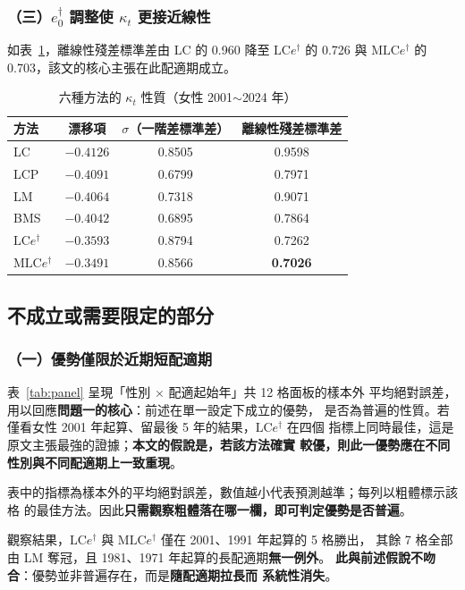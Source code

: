 \documentclass[UTF8, fontset=macnew, a4paper, 12pt]{ctexart}
\newcommand{\edag}{e_0^{\dagger}}
\newcommand{\LCe}{\mathrm{LC}e^{\dagger}}
\begin{document}
\subsubsection{（三）$\edag$ 調整使 $\kappa_t$ 更接近線性}

如表~\ref{tab:kappa}，離線性殘差標準差由 LC 的 0.960 降至 $\LCe$ 的 0.726 與 M$\LCe$ 的
0.703，該文的核心主張在此配適期成立。

\begin{table}[H]
\centering
\caption{六種方法的 $\kappa_t$ 性質（女性 2001$\sim$2024 年）}
\small
\begin{tabular}{lccc}
\toprule
方法 & 漂移項 & $\sigma$（一階差標準差） & 離線性殘差標準差\\
\midrule
LC      & $-0.4126$ & 0.8505 & 0.9598\\
LCP     & $-0.4091$ & 0.6799 & 0.7971\\
LM      & $-0.4064$ & 0.7318 & 0.9071\\
BMS     & $-0.4042$ & 0.6895 & 0.7864\\
$\LCe$  & $-0.3593$ & 0.8794 & 0.7262\\
M$\LCe$ & $-0.3491$ & 0.8566 & \textbf{0.7026}\\
\bottomrule
\end{tabular}
\label{tab:kappa}
\end{table}

\subsection{不成立或需要限定的部分}

\subsubsection{（一）優勢僅限於近期短配適期}\label{sec:window}

表~\ref{tab:panel} 呈現「性別 $\times$ 配適起始年」共 12 格面板的樣本外
平均絕對誤差，用以回應\textbf{問題一的核心}：前述在單一設定下成立的優勢，
是否為普遍的性質。若僅看女性 2001 年起算、留最後 5 年的結果，$\LCe$ 在四個
指標上同時最佳，這是原文主張最強的證據；\textbf{本文的假說是，若該方法確實
較優，則此一優勢應在不同性別與不同配適期上一致重現}。

表中的指標為樣本外的平均絕對誤差，數值越小代表預測越準；每列以粗體標示該格
的最佳方法。因此\textbf{只需觀察粗體落在哪一欄，即可判定優勢是否普遍}。

觀察結果，$\LCe$ 與 M$\LCe$ 僅在 2001、1991 年起算的 5 格勝出，
其餘 7 格全部由 LM 奪冠，且 1981、1971 年起算的長配適期\textbf{無一例外}。
\textbf{此與前述假說不吻合}：優勢並非普遍存在，而是\textbf{隨配適期拉長而
系統性消失}。
\end{document}

